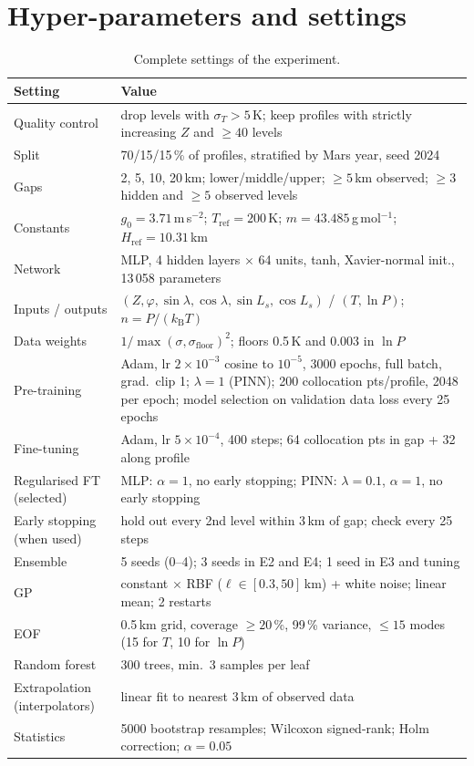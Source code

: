 \documentclass[11pt,a4paper]{article}
\newcommand{\kB}{k_{\mathrm{B}}}
\newcommand{\Href}{H_{\mathrm{ref}}}
\newcommand{\Tref}{T_{\mathrm{ref}}}
\begin{document}
\section{Hyper-parameters and settings}\label{app:hyper}
\begin{table}[h]
\centering\small
\caption{Complete settings of the experiment.}\label{tab:hyper}
\begin{tabular}{lp{8.2cm}}
\toprule
Setting & Value\\
\midrule
Quality control & drop levels with $\sigma_T>5$\,K; keep profiles with strictly increasing $Z$ and $\ge40$ levels\\
Split & 70/15/15\,\% of profiles, stratified by Mars year, seed 2024\\
Gaps & 2, 5, 10, 20\,km; lower/middle/upper; $\ge5$\,km observed; $\ge3$ hidden and $\ge5$ observed levels\\
Constants & $g_0=3.71$\,m\,s$^{-2}$; $\Tref=200$\,K; $m=43.485$\,g\,mol$^{-1}$; $\Href=10.31$\,km\\
Network & MLP, 4 hidden layers $\times$ 64 units, tanh, Xavier-normal init., 13\,058 parameters\\
Inputs / outputs & $(Z,\varphi,\sin\lambda,\cos\lambda,\sin L_s,\cos L_s)$ / $(T,\ln P)$; $n=P/(\kB T)$\\
Data weights & $1/\max(\sigma,\sigma_\mathrm{floor})^2$; floors 0.5\,K and 0.003 in $\ln P$\\
Pre-training & Adam, lr $2\times10^{-3}$ cosine to $10^{-5}$, 3000 epochs, full batch, grad.\ clip 1; $\lambda=1$ (PINN); 200 collocation pts/profile, 2048 per epoch; model selection on validation data loss every 25 epochs\\
Fine-tuning & Adam, lr $5\times10^{-4}$, 400 steps; 64 collocation pts in gap + 32 along profile\\
Regularised FT (selected) & MLP: $\alpha=1$, no early stopping; PINN: $\lambda=0.1$, $\alpha=1$, no early stopping\\
Early stopping (when used) & hold out every 2nd level within 3\,km of gap; check every 25 steps\\
Ensemble & 5 seeds (0--4); 3 seeds in E2 and E4; 1 seed in E3 and tuning\\
GP & constant $\times$ RBF ($\ell\in[0.3,50]$\,km) + white noise; linear mean; 2 restarts\\
EOF & 0.5\,km grid, coverage $\ge20$\,\%, 99\,\% variance, $\le15$ modes (15 for $T$, 10 for $\ln P$)\\
Random forest & 300 trees, min.\ 3 samples per leaf\\
Extrapolation (interpolators) & linear fit to nearest 3\,km of observed data\\
Statistics & 5000 bootstrap resamples; Wilcoxon signed-rank; Holm correction; $\alpha=0.05$\\
\bottomrule
\end{tabular}
\end{table}
\end{document}
